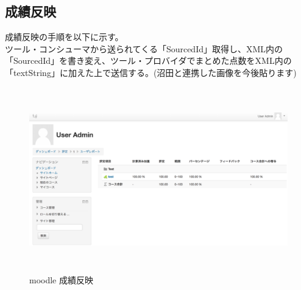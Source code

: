 \subsection{成績反映}
成績反映の手順を以下に示す。\\
ツール・コンシューマから送られてくる「SourcedId」取得し、XML内の「SourcedId」を書き変え、ツール・プロバイダでまとめた点数をXML内の「textString」に加えた上で送信する。(沼田と連携した画像を今後貼ります)\\
\begin{figure}[htbp]
  \begin{center}
    \includegraphics[clip,width=12.0cm,height=8.0cm]{img/score.png}
    \caption{moodle 成績反映}
    \label{fig:moodle score}
  \end{center}
\end{figure}
